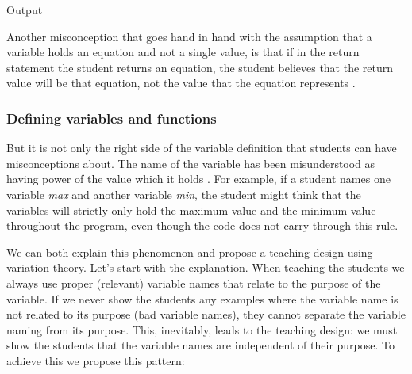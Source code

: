 \begin{frame}[fragile]
  \begin{example}
  \end{example}

  \begin{block}{Output}
  \end{block}
\end{frame}



Another misconception that goes hand in hand with the assumption that a 
variable holds an equation and not a single value, is that if in the return 
statement the student returns an equation, the student believes that the return 
value will be that equation, not the value that the equation represents 
\autocite{Kohn2017VariableEvaluation}.


\subsubsection{Defining variables and functions}

But it is not only the right side of the variable definition that students 
can 
have misconceptions about. The name of the variable has been misunderstood 
as 
having power of the value which it holds 
\autocite{MisconceptionsSurvey2017,Sleeman1984}. For example, if a student 
names one variable \emph{max} and another variable \emph{min}, the student 
might think that the variables will strictly only hold the maximum value 
and 
the minimum value throughout the program, even though the code does not 
carry through this rule. 

We can both explain this phenomenon and propose a teaching design using 
variation theory.
Let's start with the explanation.
When teaching the students we always use proper (\ie relevant) variable 
names 
that relate to the purpose of the variable.
If we never show the students any examples where the variable name is not 
related to its purpose (bad variable names), they cannot separate the 
variable 
naming from its purpose.
This, inevitably, leads to the teaching design:
we must show the students that the variable names are independent of their 
purpose. To achieve this we propose this pattern:

